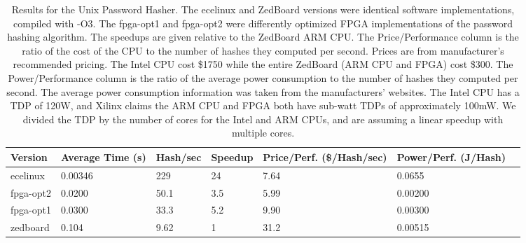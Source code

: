 \begin{table}[h]
\centering
\begin{tabular}{@{}lllllll@{}}
\toprule
  Version   & Average Time (s) & Hash/sec & Speedup & Price/Perf. (\$/Hash/sec) & Power/Perf. (J/Hash) \\ \midrule
  ecelinux  & 0.00346          & 229      & 24      & 7.64  & 0.0655                        \\
  fpga-opt2 & 0.0200           & 50.1     & 3.5     & 5.99  & 0.00200                       \\
  fpga-opt1 & 0.0300           & 33.3     & 5.2     & 9.90  & 0.00300                       \\
  zedboard  & 0.104            & 9.62     & 1       & 31.2  & 0.00515                       \\ \bottomrule
\end{tabular}
\caption {Results for the Unix Password Hasher. The ecelinux and ZedBoard versions were identical software
  implementations, compiled with -O3. The fpga-opt1 and fpga-opt2 were differently optimized FPGA
  implementations of the password hashing algorithm. The speedups are given relative to the ZedBoard ARM
  CPU. The Price/Performance column is the ratio of the cost of the CPU to the number of hashes they computed
  per second. Prices are from manufacturer's recommended pricing. The Intel CPU cost \$1750 while the
  entire ZedBoard (ARM CPU and FPGA) cost \$300. The Power/Performance column is the ratio of the average
  power consumption to the number of hashes they computed per second. The average power consumption
  information was taken from the manufacturers' websites. The Intel CPU has a TDP of 120W, and Xilinx 
  claims the ARM CPU and FPGA both have sub-watt TDPs of approximately 100mW. We divided the TDP by the
  number of cores for the Intel and ARM CPUs, and are assuming a linear speedup with multiple cores.}
\label{table:hashresults}
\end{table}

